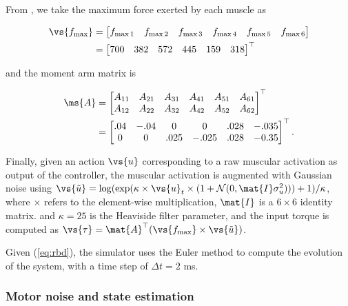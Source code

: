\documentclass[10pt]{article}
\begin{document}
From \cite{katayama93}, we take the maximum force exerted by each muscle as

\begin{align*}
  \vs{f_{\max}}   & = \begin{bmatrix}f_{\max1} & f_{\max2} & f_{\max3} & f_{\max4} & f_{\max5} & f_{\max6}\end{bmatrix} \\
                  & = \begin{bmatrix}700 & 382 & 572 & 445 & 159 & 318\end{bmatrix}^\top \\
\end{align*}

and the moment arm matrix is

\begin{align*}
  \ms{A}          & = \begin{bmatrix}
    A_{11} & A_{21} & A_{31} & A_{41} & A_{51} & A_{61} \\
    A_{12} & A_{22} & A_{32} & A_{42} & A_{52} & A_{62} \\
  \end{bmatrix}^\top \\
  & = \begin{bmatrix}
    .04 & -.04 &    0 &     0 & .028 & -.035 \\
    0 &    0 & .025 & -.025 & .028 & -0.35 \\
  \end{bmatrix}^\top.\\
\end{align*}

Finally, given an action $\vs{u}$ corresponding to a raw muscular activation as output of the
controller, the muscular activation
is augmented with Gaussian noise using $\vs{\tilde{u}} = \log(\exp(\kappa \times \vs{u}_t \times (1+\mathcal{N}(0,\mat{I}\sigma_u^2))) + 1) / \kappa$, where $\times$ refers to the element-wise multiplication, $\mat{I}$ is a $6 \times 6$ identity matrix.
and $\kappa = 25$ is the Heaviside filter parameter, and the input torque 
is computed as $\vs{\tau} = \mat{A}^\top (\vs{f_{\max}} \times \vs{\tilde{u}})$.

Given (\ref{eq:rbd}), the simulator uses the Euler method to compute the evolution of the system, with a time step of $\Delta t = 2$ ms.

\subsubsection{Motor noise and state estimation}
\end{document}
